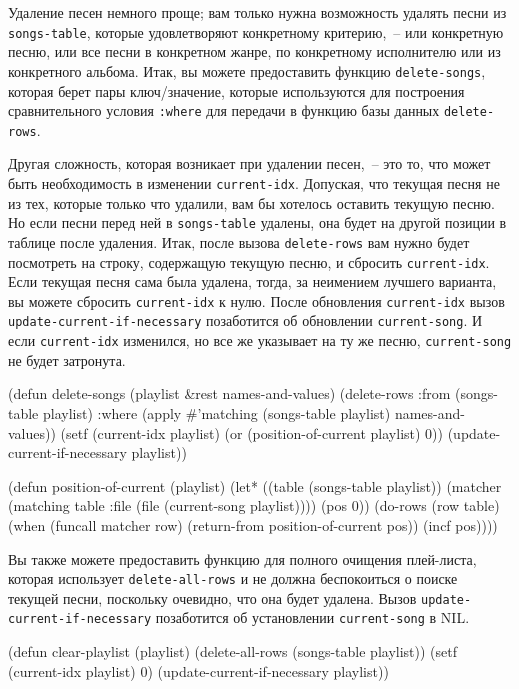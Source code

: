 Удаление песен немного проще; вам только нужна возможность удалять песни из
\lstinline{songs-table}, которые удовлетворяют конкретному критерию,~-- или конкретную песню, или
все песни в конкретном жанре, по конкретному исполнителю или из конкретного альбома. Итак,
вы можете предоставить функцию \lstinline{delete-songs}, которая берет пары ключ/значение,
которые используются для построения сравнительного условия \lstinline{:where} для передачи в функцию
базы данных \lstinline{delete-rows}.

Другая сложность, которая возникает при удалении песен,~-- это то, что может быть необходимость
в изменении \lstinline{current-idx}. Допуская, что текущая песня не из тех, которые только что
удалили, вам бы хотелось оставить текущую песню. Но если песни перед ней в
\lstinline{songs-table} удалены, она будет на другой позиции в таблице после удаления. Итак,
после вызова \lstinline{delete-rows} вам нужно будет посмотреть на строку, содержащую текущую
песню, и сбросить \lstinline{current-idx}. Если текущая песня сама была удалена, тогда, за
неимением лучшего варианта, вы можете сбросить \lstinline{current-idx} к нулю. После обновления
\lstinline{current-idx} вызов \lstinline{update-current-if-necessary} позаботится об обновлении
\lstinline{current-song}. И если \lstinline{current-idx} изменился, но все же указывает на ту же
песню, \lstinline{current-song} не будет затронута.

\begin{myverb}
(defun delete-songs (playlist &rest names-and-values)
  (delete-rows
   :from (songs-table playlist)
   :where (apply #'matching (songs-table playlist) names-and-values))
  (setf (current-idx playlist) (or (position-of-current playlist) 0))
  (update-current-if-necessary playlist))

(defun position-of-current (playlist)
  (let* ((table (songs-table playlist))
         (matcher (matching table :file (file (current-song playlist))))
         (pos 0))
    (do-rows (row table)
      (when (funcall matcher row)
        (return-from position-of-current pos))
      (incf pos))))
\end{myverb}

Вы также можете предоставить функцию для полного очищения плей-листа, которая использует
\lstinline{delete-all-rows} и не должна беспокоиться о поиске текущей песни, поскольку очевидно,
что она будет удалена. Вызов \lstinline{update-current-if-necessary} позаботится об
установлении \lstinline{current-song} в NIL.

\begin{myverb}
(defun clear-playlist (playlist)
  (delete-all-rows (songs-table playlist))
  (setf (current-idx playlist) 0)
  (update-current-if-necessary playlist))
\end{myverb}

